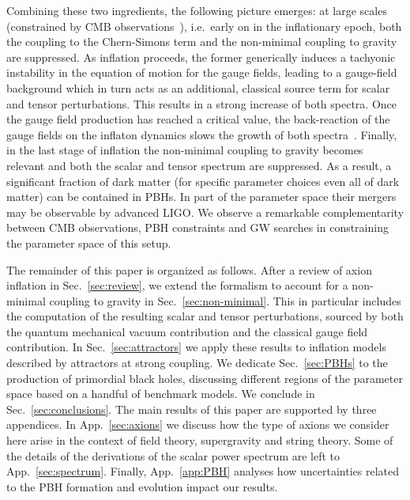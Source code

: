 Combining these two ingredients, the following picture emerges: at large scales (constrained by CMB observations~\cite{Ade:2015lrj}), i.e.\ early on in the inflationary epoch, both the coupling to the Chern-Simons term and the non-minimal coupling to gravity are suppressed. As inflation proceeds, the former generically induces a tachyonic instability in the equation of motion for the gauge fields, leading to a gauge-field background which in turn acts as an additional, classical source term for scalar and tensor perturbations. This results in a strong increase of both spectra. Once the gauge field production has reached a critical value, the back-reaction of the gauge fields on the inflaton dynamics slows the growth of both spectra~\cite{Anber:2009ua,Barnaby:2011qe,Barnaby:2011vw}. Finally, in the last stage of inflation the non-minimal coupling to gravity becomes relevant and both the scalar and tensor spectrum are suppressed. As a result, a significant fraction of dark matter (for specific parameter choices even all of dark matter) can be contained in PBHs. In part of the parameter space their mergers may be observable by advanced LIGO. We observe a remarkable complementarity between CMB observations, PBH constraints and GW searches in constraining the parameter space of this setup.


The remainder of this paper is organized as follows. After a review of axion inflation in Sec.~\ref{sec:review}, we extend the formalism to account for a non-minimal coupling to gravity in Sec.~\ref{sec:non-minimal}. This in particular includes the computation of the resulting scalar and tensor perturbations, sourced by both the quantum mechanical vacuum contribution and the classical gauge field contribution. In Sec.~\ref{sec:attractors} we apply these results to inflation models described by attractors at strong coupling. We dedicate Sec.~\ref{sec:PBHs} to the production of primordial black holes, discussing different regions of the parameter space based on a handful of benchmark models. We conclude in Sec.~\ref{sec:conclusions}. The main results of this paper are supported by three appendices. In App.~\ref{sec:axions} we discuss how the type of axions we consider here arise in the context of field theory, supergravity and string theory. Some of the details of the derivations of the scalar power spectrum are left to App.~\ref{sec:spectrum}. Finally, App.~\ref{app:PBH} analyses how uncertainties related to the PBH formation and evolution impact our results.